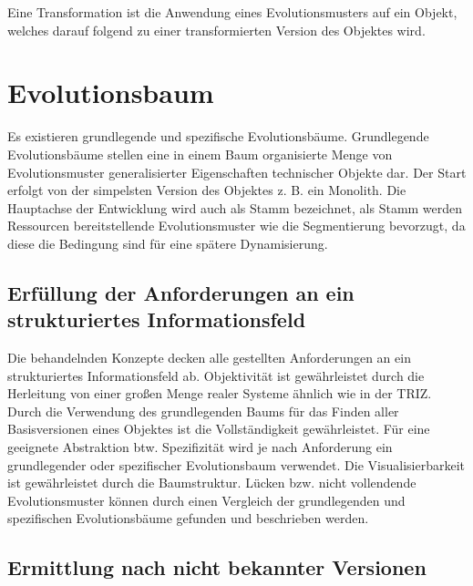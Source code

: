 \documentclass[11pt,a4paper]{article}
\begin{document}
Eine Transformation ist die Anwendung eines Evolutionsmusters auf ein Objekt, welches darauf folgend zu einer transformierten Version des Objektes wird.

\section{Evolutionsbaum}

Es existieren grundlegende und spezifische Evolutionsbäume. Grundlegende Evolutionsbäume stellen eine in einem Baum organisierte Menge von Evolutionsmuster generalisierter Eigenschaften technischer Objekte dar. Der Start erfolgt von der simpelsten Version des Objektes z. B. ein Monolith. Die Hauptachse der Entwicklung wird auch als Stamm bezeichnet, als Stamm werden Ressourcen bereitstellende Evolutionsmuster wie die Segmentierung bevorzugt, da diese die Bedingung sind für eine spätere Dynamisierung.


\subsection{Erfüllung der Anforderungen an ein strukturiertes Informationsfeld}

Die behandelnden Konzepte decken alle gestellten Anforderungen an ein strukturiertes Informationsfeld ab. Objektivität ist gewährleistet durch die Herleitung von einer großen Menge realer Systeme ähnlich wie in der TRIZ. Durch die Verwendung des grundlegenden Baums für das Finden aller Basisversionen eines Objektes ist die Vollständigkeit gewährleistet. Für eine geeignete Abstraktion btw. Spezifizität wird je nach Anforderung ein grundlegender oder spezifischer Evolutionsbaum verwendet. Die Visualisierbarkeit ist gewährleistet durch die Baumstruktur. Lücken bzw. nicht vollendende Evolutionsmuster können durch einen Vergleich der grundlegenden und spezifischen Evolutionsbäume gefunden und beschrieben werden.

\subsection{Ermittlung nach nicht bekannter Versionen}
\end{document}
